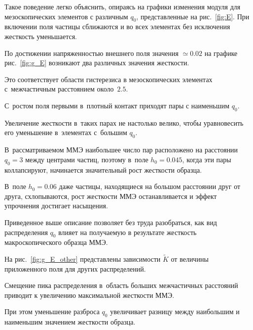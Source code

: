 Такое поведение легко объяснить, опираясь на графики изменения модуля для мезоскопических элементов с различным $q_0$, представленные на рис.~\ref{fig:E}. При включении поля частицы сближаются и во всех элементах без исключения жесткость уменьшается. 

По достижении напряженностью внешнего поля значения  $\simeq 0.02$ на графике рис.~\ref{fig:g_E} возникают два различных значения жесткости. 

Это соответствует области гистерезиса в мезоскопических элементах с~межчастичным расстоянием около~$2.5$. 

С~ростом поля первыми в~плотный контакт приходят пары с наименьшим $q_0$. 

Увеличение жесткости в~таких парах не настолько велико, чтобы уравновесить его уменьшение в~элементах с~большим $q_0$. 

В~рассматриваемом ММЭ наибольшее число пар расположено на расстоянии $q_0=3$ между центрами частиц, поэтому в~поле $h_0=0.045$, когда эти пары коллапсируют, начинается значительный рост жесткости образца. 

В~поле $h_0=0.06$ даже частицы, находящиеся на большом расстоянии друг от друга, схлопываются, рост жесткости ММЭ останавливается и эффект упрочнения достигает насыщения. 



Приведенное выше описание позволяет без труда разобраться, как вид распределения $q_0$ влияет на получаемую в результате жесткость макроскопического образца ММЭ. 

На рис.~\ref{fig:g_E_other} представлены зависимости $\tilde K$ от величины приложенного поля для других распределений. 

Смещение пика распределения в~область больших межчастичных расстояний приводит к увеличению максимальной жесткости ММЭ. 

При этом уменьшение разброса $q_0$ увеличивает разницу между наибольшим и наименьшим значением жесткости образца.





\smallskip





